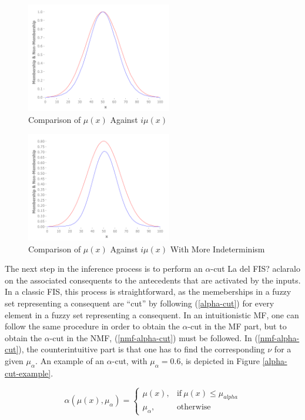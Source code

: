 \documentclass[conference]{IEEEtran}
\begin{document}
\begin{figure}[!t]
  \centering
  \includegraphics[width=2.5in]{if-membership}
  \caption{Comparison of $\mu(x)$ Against $i\mu(x)$}
  \label{if-membership}
\end{figure}

\begin{figure}[!t]
  \centering
  \includegraphics[width=2.5in]{if-membership-drastic}
  \caption{Comparison of $\mu(x)$ Against $i\mu(x)$ With More Indeterminism}
  \label{if-membership-drastic}
\end{figure}

The next step in the inference process is to perform an $\alpha$-cut %
La del FIS? aclaralo on the associated consequents to the antecedents that are
activated by the inputs. In a classic FIS, this process is straightforward, as
the memeberships in a fuzzy set representing a consequent are ``cut'' by
following (\ref{alpha-cut}) for every element in a fuzzy set representing a
consequent. In an intuitionistic MF, one can follow the same procedure in order
to obtain the $\alpha$-cut in the MF part, but to obtain the $\alpha$-cut in
the NMF, (\ref{nmf-alpha-cut}) must be followed. In (\ref{nmf-alpha-cut}), the
counterintuitive part is that one has to find the corresponding $\nu$ for a
given $\mu_{\alpha}$. An example of an $\alpha$-cut, with $\mu_{\alpha} = 0.6$,
is depicted in Figure \ref{alpha-cut-example}.

\begin{equation}
  \label{alpha-cut}
  \alpha(\mu (x),\mu_{\alpha}) =
  \begin{cases}
    \mu (x), & \text{if}\ \mu (x) \leq \mu_{alpha}  \\
    \mu_{\alpha}, & \text{otherwise}
  \end{cases}
\end{equation}
\end{document}
